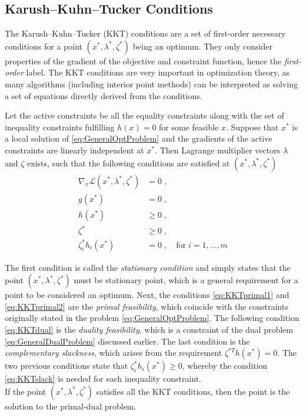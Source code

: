 \subsection{Karush–Kuhn–Tucker Conditions}
The Karush–Kuhn–Tucker (KKT) conditions are a set of first-order necessary conditions for a point $(x^*,\lambda^*,\zeta^*)$ being an optimum. They only consider properties of the gradient of the objective and constraint function, hence the \textit{first-order} label. The KKT conditions are very important in optimization theory, as many algorithms (including interior point methods) can be interpreted as solving a set of equations directly derived from the conditions.    

\begin{theorem}
	Let the active constraints be all the equality constraints along with the set of inequality constraints fulfilling $h(x) = 0$ for some feasible $x$. Suppose that $x^*$ is a local solution of \eqref{eq:GeneralOptProblem} and the gradients of the active constraints are linearly independent at $x^*$. Then Lagrange multiplier vectors $\lambda$ and $\zeta$ exists, such that the following conditions are satisfied at $(x^*,\lambda^*,\zeta^*)$ \cite{wright}
\begin{subequations}	
\begin{align}
\nabla_x \mathcal{L}(x^*,\lambda^*,\zeta^*) &= 0 \; ,  	\\
g(x^*) &= 0 \; ,  \label{eq:KKTprimal1}					\\
h(x^*) &\geq 0 \; ,  \label{eq:KKTprimal2}				\\
\zeta^*  &\geq 0 \; , \label{eq:KKTdual}					\\ 
\zeta_{i}^* h_i (x^*) &= 0 \; , \quad \mathrm{for} \; i = 1 , \ldots , m \label{eq:KKTslack}
\end{align}
\label{eq:KKTconditions}
\end{subequations}	  
\end{theorem}
The first condition is called the \textit{stationary condition} and simply states that the point $(x^*,\lambda^*,\zeta^*)$ must be stationary point, which is a general requirement for a point to be considered an optimum. Next, the conditions \eqref{eq:KKTprimal1} and \eqref{eq:KKTprimal2} are the \textit{primal feasibility}, which coincide with the constraints originally stated in the problem \eqref{eq:GeneralOptProblem}. The following condition \eqref{eq:KKTdual} is the \textit{duality feasibility}, which is a constraint of the dual problem \eqref{eq:GeneralDualProblem} discussed earlier.
The last condition is the \textit{complementary slackness}, which arises from the requirement $\zeta^{*T} h(x^*) = 0$. The two previous conditions state that $\zeta_{i}^{*} h_i(x^*) \geq 0$, whereby the condition \eqref{eq:KKTslack} is needed for each inequality constraint.\\
If the point $(x^*,\lambda^*,\zeta^*)$ satisfies all the KKT conditions, then the point is the solution to the primal-dual problem.


